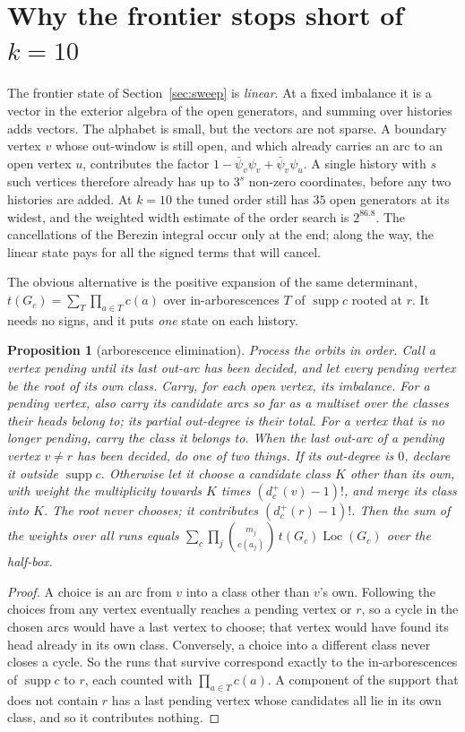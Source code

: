 \documentclass[11pt]{article}
\theoremstyle{plain}
\newtheorem{proposition}[theorem]{Proposition}
\theoremstyle{definition}
\theoremstyle{remark}
\newcommand{\supp}{\operatorname{supp}}
\newcommand{\Loc}{\operatorname{Loc}}
\newcommand{\bpsi}{\bar\psi}
\begin{document}
\section{Why the frontier stops short of $k=10$}\label{sec:wall}

The frontier state of Section~\ref{sec:sweep} is \emph{linear}. At a fixed imbalance it is a
vector in the exterior algebra of the open generators, and summing over histories adds vectors.
The alphabet is small, but the vectors are not sparse. A boundary vertex $v$ whose out-window
is still open, and which already carries an arc to an open vertex $u$, contributes the factor
$1-\bpsi_v\psi_v+\bpsi_v\psi_u$. A single history with $s$ such vertices therefore already has
up to $3^{s}$ non-zero coordinates, before any two histories are added. At $k=10$ the tuned
order still has $35$ open generators at its widest, and the weighted width estimate of the
order search is $2^{86.8}$. The cancellations of the Berezin integral occur only at the end;
along the way, the linear state pays for all the signed terms that will cancel.

The obvious alternative is the positive expansion of the same determinant,
$t(G_c)=\sum_T\prod_{a\in T}c(a)$ over in-arborescences $T$ of $\supp c$ rooted at $r$. It needs
no signs, and it puts \emph{one} state on each history.

\begin{proposition}[arborescence elimination]\label{prop:arbor}
Process the orbits in order. Call a vertex \emph{pending} until its last out-arc has been
decided, and let every pending vertex be the root of its own class. Carry, for each open vertex,
its imbalance. For a pending vertex, also carry its candidate arcs so far as a multiset over the
classes their heads belong to; its partial out-degree is their total. For a vertex that is no
longer pending, carry the class it belongs to. When the last out-arc of a pending vertex
$v\ne r$ has been decided, do one of two things. If its out-degree is $0$, declare it outside
$\supp c$. Otherwise let it choose a candidate class $K$ other than its own, with weight the
multiplicity towards $K$ times $(d^+_c(v)-1)!$, and merge its class into $K$. The root never
chooses; it contributes $(d^+_c(r)-1)!$. Then the sum of the weights over all runs equals
$\sum_c\prod_j\binom{m_j}{c(a_j)}\,t(G_c)\Loc(G_c)$ over the half-box.
\end{proposition}

\begin{proof}
A choice is an arc from $v$ into a class other than $v$'s own. Following the choices from any
vertex eventually reaches a pending vertex or $r$, so a cycle in the chosen arcs would have a
last vertex to choose; that vertex would have found its head already in its own class.
Conversely, a choice into a different class never closes a cycle. So the runs that survive
correspond exactly to the in-arborescences of $\supp c$ to $r$, each counted with
$\prod_{a\in T}c(a)$. A component of the support that does not contain $r$ has a last pending
vertex whose candidates all lie in its own class, and so it contributes nothing.
\end{proof}
\end{document}
